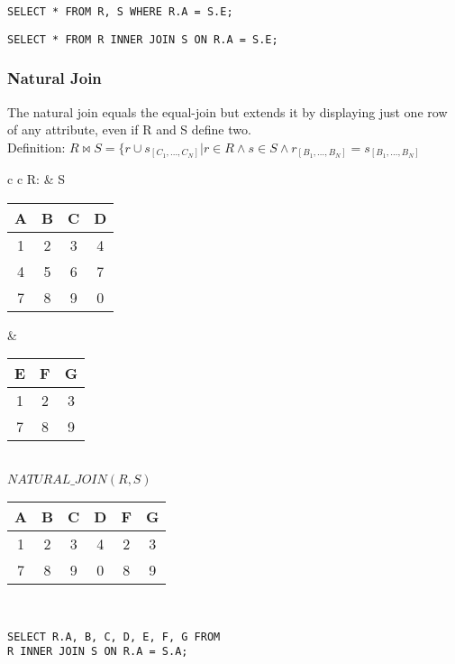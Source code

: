 \lstset{language=SQL,tabsize=4,captionpos=b,frame=single,
basicstyle=\footnotesize}
\begin{lstlisting}[caption=SQL Equi-Join]
SELECT * FROM R, S WHERE R.A = S.E;
\end{lstlisting}
\begin{lstlisting}[caption=SQL Equi-Join]
SELECT * FROM R INNER JOIN S ON R.A = S.E;
\end{lstlisting}

\subsubsection{Natural Join}
The natural join equals the equal-join but extends it by displaying just one row
of any attribute, even if R and S define two.\\
Definition: $R \bowtie S = \{r \cup s_{[C_1, \dots, C_N]} | r \in R \land s \in S
\land r_{[B_1, \dots, B_N]} = s_{[B_1, \dots, B_N]}$

\begin{tabular}{ c c}
	R: & S \\
	\begin{tabular}{|c|c|c|c|}
		\hline
		A & B & C & D\\
		\hline
		1 & 2 & 3 & 4\\
		\hline
		4 & 5 & 6 & 7\\
		\hline
		7 & 8 & 9 & 0\\
		\hline
	\end{tabular} &

	\begin{tabular}{|c|c|c|}
		\hline
		E & F & G \\
		\hline
		1 & 2 & 3\\
		\hline
		7 & 8 & 9\\
		\hline
	\end{tabular}
\end{tabular}\\

$NATURAL\_JOIN(R,S)$ \\
\begin{tabular}{|c|c|c|c|c|c|}
	\hline
	A & B & C & D & F & G \\
	\hline
	1 & 2 & 3 & 4 & 2 & 3\\
	\hline
	7 & 8 & 9 & 0 & 8 & 9\\
	\hline
\end{tabular}\\

\lstset{language=SQL,tabsize=4,captionpos=b,frame=single,
basicstyle=\footnotesize}
\begin{lstlisting}[caption=SQL Natural-Join]
SELECT R.A, B, C, D, E, F, G FROM 
R INNER JOIN S ON R.A = S.A;
\end{lstlisting}

